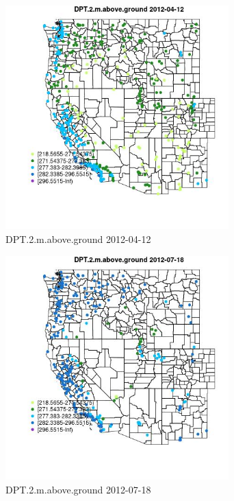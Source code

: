 \begin{figure} 
\centering  
\includegraphics[width=0.77\textwidth]{Code_Outputs/Report_ML_input_PM25_Step4_part_e_de_duplicated_aves_compiled_2019-05-14wNAs_MapObsDPT2maboveground2012-04-12.jpg} 
\caption{\label{fig:Report_ML_input_PM25_Step4_part_e_de_duplicated_aves_compiled_2019-05-14wNAsMapObsDPT2maboveground2012-04-12}DPT.2.m.above.ground 2012-04-12} 
\end{figure} 
 

\clearpage 

\begin{figure} 
\centering  
\includegraphics[width=0.77\textwidth]{Code_Outputs/Report_ML_input_PM25_Step4_part_e_de_duplicated_aves_compiled_2019-05-14wNAs_MapObsDPT2maboveground2012-07-18.jpg} 
\caption{\label{fig:Report_ML_input_PM25_Step4_part_e_de_duplicated_aves_compiled_2019-05-14wNAsMapObsDPT2maboveground2012-07-18}DPT.2.m.above.ground 2012-07-18} 
\end{figure} 
 

